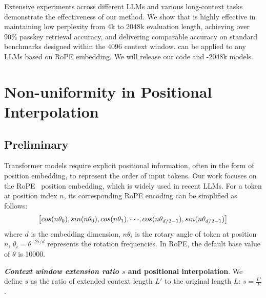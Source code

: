 \documentclass{article}
\theoremstyle{plain}
\theoremstyle{definition}
\theoremstyle{remark}
\begin{document}
Extensive experiments across different LLMs and various long-context tasks demonstrate the effectiveness of our method. We show that {\sysname} is highly effective in maintaining low perplexity from 4k to 2048k evaluation length,  achieving over 90\% passkey retrieval accuracy, and delivering  comparable accuracy on standard benchmarks designed within the 4096 context window.  {\sysname} can be applied to any LLMs based on RoPE embedding. We will release our code and {\sysname}-2048k models.

	
	
\section{Non-uniformity in Positional Interpolation}
\label{sec:analysis}
\subsection{Preliminary}
Transformer models require explicit positional information, often in the form of position embedding, to represent the order of input tokens. Our work focuses on the RoPE~\cite{rope} position embedding, which is widely used in recent  LLMs. For a token at position index $n$, its corresponding RoPE encoding can be simplified as follows:
\vspace{-1ex}
\begin{equation}
		\fontsize{7.8}{7.8} \selectfont
	\label{eq:rope}
	\left[ cos(n\theta_0), sin(n\theta_0), cos(n\theta_1), \cdot\cdot\cdot, cos(n\theta_{d/2-1}), sin(n\theta_{d/2-1}) \right]   
\end{equation}
where $d$ is the embedding dimension, 
 $n\theta_i$ is the rotary angle of token at position $n$, 
$\theta_i=\theta^{-2i/d}$ represents the rotation frequencies. In RoPE, the default base value of $\theta$ is 10000. 



\noindent\textbf{\emph{Context window extension ratio $s$} and positional interpolation}. We define $s$ as  the ratio of extended context length $L'$ to the original length $L$: $s=\frac{L'}{L}$. 
\end{document}
